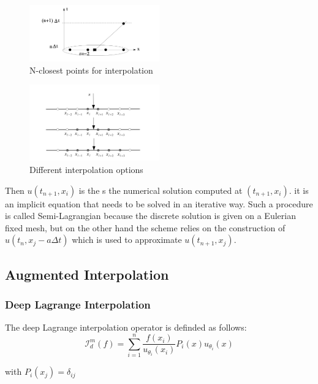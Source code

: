 \documentclass{article}
\begin{document}
\begin{figure}[!h]
\centering
\includegraphics[width=0.5\textwidth]{images/12.png}
\caption{N-closest points for interpolation}
\end{figure}


\begin{figure}[!h]
\centering
\includegraphics[width=0.5\textwidth]{images/13.png}
\caption{Different interpolation options}
\end{figure}

Then  $u\left(t_{n+1}, x_i\right)$ is the s the numerical solution computed at $\left(t_{n+1}, x_i\right)$. it is an implicit equation that needs to be solved in an iterative way.
Such a procedure is called Semi-Lagrangian because the discrete solution is given on a Eulerian fixed mesh, but on the other hand the scheme relies on the construction of $u\left(t_n, x_j-a \Delta t\right)$ which is used to approximate  $u\left(t_{n+1}, x_j\right)$.


\subsection{Augmented Interpolation}

\subsubsection{Deep Lagrange Interpolation}
The deep Lagrange interpolation operator is definded as follows:
\begin{equation*}
    \mathcal{I}_d^m(f)=\sum_{i=1}^n \frac{f\left(x_i\right)}{u_{\theta_i}\left(x_i\right)} P_i(x) u_{\theta_i}(x)
\end{equation*}

with $P_i\left(x_j\right)=\delta_{i j}$
\end{document}
